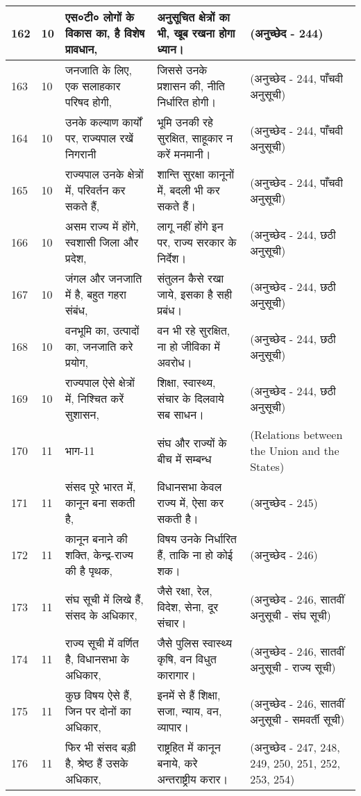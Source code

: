 \begin{longtable}{|l|l|l|l|l|}
162 & 10 & एस०टी० लोगों के विकास का, है विशेष प्रावधान, & अनुसूचित क्षेत्रों का भी, खूब रखना होगा ध्यान। & (अनुच्छेद - 244) \\ \hline 
163 & 10 & जनजाति के लिए, एक सलाहकार परिषद होगी, & जिससे उनके प्रशासन की, नीति निर्धारित होगी। & (अनुच्छेद - 244, पाँचवी अनुसूची) \\ \hline 
164 & 10 & उनके कल्याण कार्यों पर, राज्यपाल रखें निगरानी & भूमि उनकी रहे सुरक्षित, साहूकार न करें मनमानी। & (अनुच्छेद - 244, पाँचवी अनुसूची) \\ \hline 
165 & 10 & राज्यपाल उनके क्षेत्रों में, परिवर्तन कर सकते हैं, & शान्ति सुरक्षा कानूनों में, बदली भी कर सकते हैं। & (अनुच्छेद - 244, पाँचवी अनुसूची) \\ \hline 
166 & 10 & असम राज्य में होंगे, स्वशासी जिला और प्रदेश, & लागू नहीं होंगे इन पर, राज्य सरकार के निर्देश। & (अनुच्छेद - 244, छठी अनुसूची) \\ \hline 
167 & 10 & जंगल और जनजाति में है, बहुत गहरा संबंध, & संतुलन कैसे रखा जाये, इसका है सही प्रबंध। & (अनुच्छेद - 244, छठी अनुसूची) \\ \hline 
168 & 10 & वनभूमि का, उत्पादों का, जनजाति करे प्रयोग, & वन भी रहे सुरक्षित, ना हो जीविका में अवरोध। & (अनुच्छेद - 244, छठी अनुसूची) \\ \hline 
169 & 10 & राज्यपाल ऐसे क्षेत्रों में, निश्चित करें सुशासन, & शिक्षा, स्वास्थ्य, संचार के दिलवाये सब साधन। & (अनुच्छेद - 244, छठी अनुसूची) \\ \hline 
170 & 11 & भाग-11 & संघ और राज्यों के बीच में सम्बन्ध & (Relations between the Union and the States) \\ \hline 
171 & 11 & संसद पूरे भारत में, कानून बना सकती है, & विधानसभा केवल राज्य में, ऐसा कर सकती है। & (अनुच्छेद - 245) \\ \hline 
172 & 11 & कानून बनाने की शक्ति, केन्द्र-राज्य की है पृथक, & विषय उनके निर्धारित हैं, ताकि ना हो कोई शक। & (अनुच्छेद - 246) \\ \hline 
173 & 11 & संघ सूची में लिखे हैं, संसद के अधिकार, & जैसे रक्षा, रेल, विदेश, सेना, दूर संचार। & (अनुच्छेद - 246, सातवीं अनुसूची - संघ सूची) \\ \hline 
174 & 11 & राज्य सूची में वर्णित है, विधानसभा के अधिकार, & जैसे पुलिस स्वास्थ्य कृषि, वन विधुत कारागार। & (अनुच्छेद - 246, सातवीं अनुसूची - राज्य सूची) \\ \hline 
175 & 11 & कुछ विषय ऐसे हैं, जिन पर दोनों का अधिकार, & इनमें से हैं शिक्षा, सजा, न्याय, वन, व्यापार। & (अनुच्छेद - 246, सातवीं अनुसूची - समवर्ती सूची) \\ \hline 
176 & 11 & फिर भी संसद बड़ी है, श्रेष्ठ हैं उसके अधिकार, & राष्ट्रहित में कानून बनाये, करे अन्तराष्ट्रीय करार। & (अनुच्छेद - 247, 248, 249, 250, 251, 252, 253, 254) \\ \hline 

\end{longtable}
